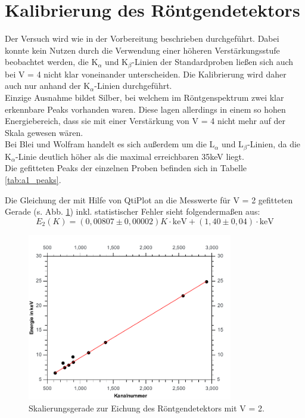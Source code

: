 \section{Kalibrierung des Röntgendetektors}

Der Versuch wird wie in der Vorbereitung beschrieben durchgeführt.
Dabei konnte kein Nutzen durch die Verwendung einer höheren Verstärkungsstufe beobachtet werden, die K$_\alpha$ und K$_\beta$-Linien der Standardproben ließen sich auch bei V = 4 nicht klar voneinander unterscheiden. Die Kalibrierung wird daher auch nur anhand der K$_\alpha$-Linien durchgeführt.\\
Einzige Ausnahme bildet Silber, bei welchem im Röntgenspektrum zwei klar erkennbare Peaks vorhanden waren. Diese lagen allerdings in einem so hohen Energiebereich, dass sie mit einer Verstärkung von V = 4 nicht mehr auf der Skala gewesen wären.\\
Bei Blei und Wolfram handelt es sich außerdem um die L$_\alpha$ und L$_\beta$-Linien, da die K$_\alpha$-Linie deutlich höher als die maximal erreichbaren 35\;keV liegt.\\
Die gefitteten Peaks der einzelnen Proben befinden sich in Tabelle \ref{tab:a1_peaks}.


Die Gleichung der mit Hilfe von QtiPlot an die Messwerte f\"ur V = 2 gefitteten Gerade (s. Abb. \ref{fig:a1_fit}) inkl. statistischer Fehler sieht folgendermaßen aus:
\begin{equation}
	E_2(K) = (0,00807\pm 0,00002)K\cdot\si{\kilo\electronvolt} + (1,40\pm 0,04)\cdot\si{\kilo\electronvolt}
\end{equation}

\begin{figure}[h]
	\centering\includegraphics[width=0.8\textwidth]{fig/a1_fit}
	\caption{Skalierungsgerade zur Eichung des Röntgendetektors mit V = 2.}
	\label{fig:a1_fit}
\end{figure}

